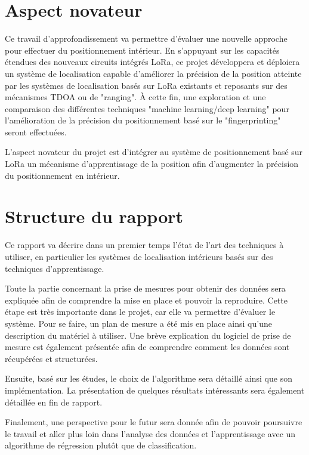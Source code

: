 \section{Aspect novateur}
Ce travail d'approfondissement va permettre d'évaluer une nouvelle approche pour effectuer du positionnement intérieur. En s'appuyant sur les capacités étendues des nouveaux circuits intégrés LoRa, ce projet développera et déploiera un système de localisation capable d'améliorer la précision de la position atteinte par les systèmes de localisation basés sur LoRa existants et reposants sur des mécanismes TDOA ou de "ranging". À cette fin, une exploration et une comparaison des différentes techniques "machine learning/deep learning" pour l'amélioration de la précision du positionnement basé sur le "fingerprinting" seront effectuées.

L'aspect novateur du projet est d'intégrer au système de positionnement basé sur LoRa un mécanisme d'apprentissage de la position afin d'augmenter la précision du positionnement en intérieur. 

\section{Structure du rapport}
Ce rapport va décrire dans un premier temps l’état de l’art des techniques à utiliser, en particulier les systèmes de localisation intérieurs basés sur des techniques d’apprentissage. 

Toute la partie concernant la prise de mesures pour obtenir des données sera expliquée afin de comprendre la mise en place et pouvoir la reproduire. Cette étape est très importante dans le projet, car elle va permettre d'évaluer le système. Pour se faire, un plan de mesure a été mis en place ainsi qu'une description du matériel à utiliser. Une brève explication du logiciel de prise de mesure est également présentée afin de comprendre comment les données sont récupérées et structurées.

Ensuite, basé sur les études, le choix de l'algorithme sera détaillé ainsi que son implémentation. La présentation de quelques résultats intéressants sera également détaillée en fin de rapport.  

Finalement, une perspective pour le futur sera donnée afin de pouvoir poursuivre le travail et aller plus loin dans l'analyse des données et l'apprentissage avec un algorithme de régression plutôt que de classification.


